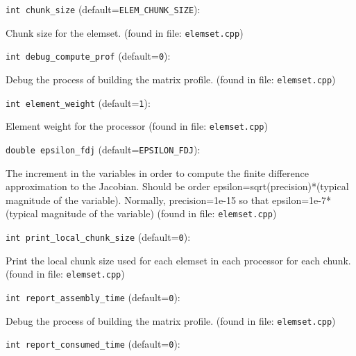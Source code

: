\item\verb+int chunk_size+ {\rm(default=\verb|ELEM_CHUNK_SIZE|)}:

Chunk size for the elemset. 
 (found in file: \verb+elemset.cpp+)
\item\verb+int debug_compute_prof+ {\rm(default=\verb|0|)}:

Debug the process of building the matrix profile. 
 (found in file: \verb+elemset.cpp+)
\item\verb+int element_weight+ {\rm(default=\verb|1|)}:

Element weight for the processor
 (found in file: \verb+elemset.cpp+)
\item\verb+double epsilon_fdj+ {\rm(default=\verb|EPSILON_FDJ|)}:

The increment in the variables in order to
compute the finite difference approximation to the
Jacobian. Should be order epsilon=sqrt(precision)*(typical
magnitude of the variable). Normally, precision=1e-15 so
that epsilon=1e-7*(typical magnitude of the
variable)
 (found in file: \verb+elemset.cpp+)
\item\verb+int print_local_chunk_size+ {\rm(default=\verb|0|)}:

Print the local chunk size used for each elemset in each
processor for each chunk. 
 (found in file: \verb+elemset.cpp+)
\item\verb+int report_assembly_time+ {\rm(default=\verb|0|)}:

Debug the process of building the matrix profile. 
 (found in file: \verb+elemset.cpp+)
\item\verb+int report_consumed_time+ {\rm(default=\verb|0|)}:


